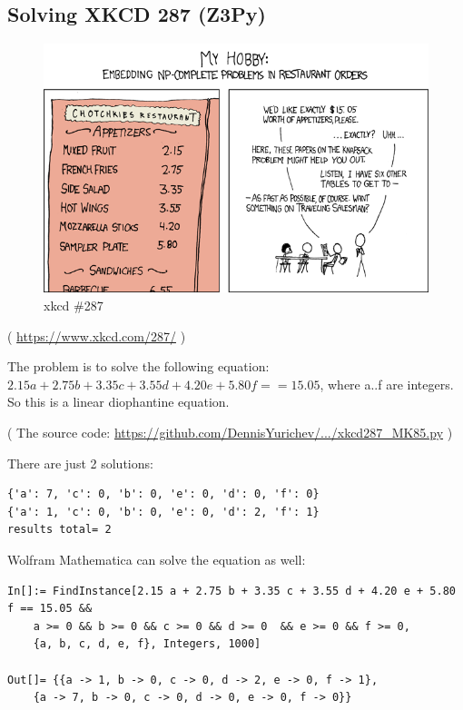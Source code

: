 \subsection{Solving XKCD 287 (Z3Py)}
\label{XkcdILP}

\begin{figure}[H]
\centering
\includegraphics[scale=7]{equations/xkcd287/np_complete.png}
\caption{xkcd \#287}
\end{figure}

( \url{https://www.xkcd.com/287/} )

The problem is to solve the following equation:
$2.15a + 2.75b + 3.35c + 3.55d + 4.20e + 5.80f == 15.05$,
where a..f are integers.
So this is a linear diophantine equation.



( The source code: \url{https://github.com/DennisYurichev/.../xkcd287_MK85.py} )

There are just 2 solutions:

\begin{lstlisting}
{'a': 7, 'c': 0, 'b': 0, 'e': 0, 'd': 0, 'f': 0}
{'a': 1, 'c': 0, 'b': 0, 'e': 0, 'd': 2, 'f': 1}
results total= 2
\end{lstlisting}

Wolfram Mathematica can solve the equation as well:

\begin{lstlisting}
In[]:= FindInstance[2.15 a + 2.75 b + 3.35 c + 3.55 d + 4.20 e + 5.80 f == 15.05 && 
	a >= 0 && b >= 0 && c >= 0 && d >= 0  && e >= 0 && f >= 0, 
	{a, b, c, d, e, f}, Integers, 1000]

Out[]= {{a -> 1, b -> 0, c -> 0, d -> 2, e -> 0, f -> 1},
	{a -> 7, b -> 0, c -> 0, d -> 0, e -> 0, f -> 0}}
\end{lstlisting}

